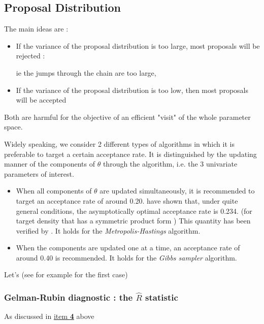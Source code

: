 \subsection{Proposal Distribution}



The main ideas are : 

\begin{itemize}
	\item If the variance of the proposal distribution is too large, most proposals will be rejected : 
	
	 ie the jumps through the chain are too large,
	\item If the variance of the proposal distribution is too low, then most proposals will be accepted
\end{itemize}
Both are harmful for the objective of an efficient "visit" of the whole parameter space. 


Widely speaking, we consider 2 different  types of algorithms in which it is preferable to target a certain acceptance rate. It is distinguished by the updating manner of the components of $\theta$ through the algorithm, i.e. the 3 univariate parameters of interest.


\begin{itemize}
	\item When all components of $\theta$ are updated simultaneously, it is recommended to target an acceptance rate of around 0.20.
	 \citet{Roberts_weak_1997} have shown that, under quite general conditions, the asymptotically optimal acceptance rate is 0.234. (for  target density that has a symmetric product form ) 
	This quantity has been verified by \citet{Sherlock_optimal_2009}. It holds for the \emph{Metropolis-Hastings} algorithm.
	
	\item When the components are updated one at a time, an acceptance rate of around 0.40 is recommended. It holds for the\emph{ Gibbs sampler} algorithm. 
\end{itemize}
Let's  (see \citet{Bédard_optimal_2008} for example for the first case)



\subsubsection*{Gelman-Rubin diagnostic : the $\hat{R}$ statistic}

As discussed in \hyperref[convdiag4]{item \textbf{4}} above

